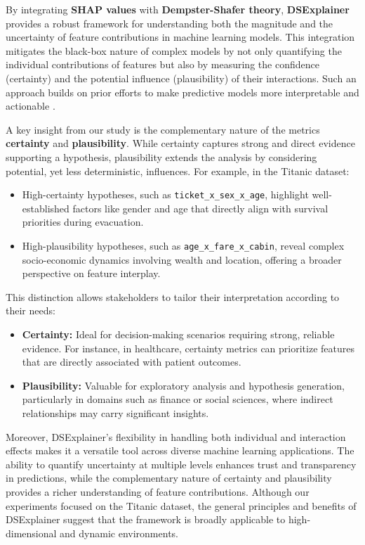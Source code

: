 \documentclass[acmlarge]{acmart}
\begin{document}
By integrating \textbf{SHAP values} with \textbf{Dempster-Shafer theory}, \textbf{DSExplainer} provides a robust framework for understanding both the magnitude and the uncertainty of feature contributions in machine learning models. This integration mitigates the black-box nature of complex models by not only quantifying the individual contributions of features but also by measuring the confidence (certainty) and the potential influence (plausibility) of their interactions. Such an approach builds on prior efforts to make predictive models more interpretable and actionable \cite{lundberg2017unified, zhang2021evidential}.

A key insight from our study is the complementary nature of the metrics \textbf{certainty} and \textbf{plausibility}. While certainty captures strong and direct evidence supporting a hypothesis, plausibility extends the analysis by considering potential, yet less deterministic, influences. For example, in the Titanic dataset:
\begin{itemize}
    \item High-certainty hypotheses, such as \texttt{ticket_x_sex_x_age}, highlight well-established factors like gender and age that directly align with survival priorities during evacuation.

    \item High-plausibility hypotheses, such as \texttt{age\_x\_fare\_x\_cabin}, reveal complex socio-economic dynamics involving wealth and location, offering a broader perspective on feature interplay.
\end{itemize}

This distinction allows stakeholders to tailor their interpretation according to their needs:
\begin{itemize}
    \item \textbf{Certainty:} Ideal for decision-making scenarios requiring strong, reliable evidence. For instance, in healthcare, certainty metrics can prioritize features that are directly associated with patient outcomes.
    \item \textbf{Plausibility:} Valuable for exploratory analysis and hypothesis generation, particularly in domains such as finance or social sciences, where indirect relationships may carry significant insights.
\end{itemize}

Moreover, DSExplainer’s flexibility in handling both individual and interaction effects makes it a versatile tool across diverse machine learning applications. The ability to quantify uncertainty at multiple levels enhances trust and transparency in predictions, while the complementary nature of certainty and plausibility provides a richer understanding of feature contributions. Although our experiments focused on the Titanic dataset, the general principles and benefits of DSExplainer suggest that the framework is broadly applicable to high-dimensional and dynamic environments.
\end{document}
